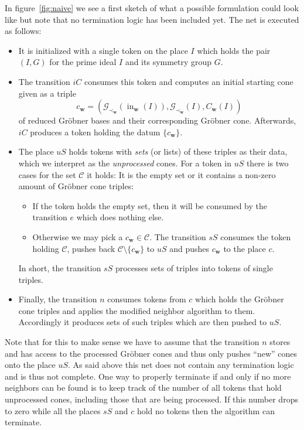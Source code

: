 \documentclass[
  paper=a4,
  titlepage,
  bibliography=totoc,
  listof=totoc,
  pagesize=pdftex
]{scrartcl}
\numberwithin{figure}{section}
\numberwithin{equation}{section}
\numberwithin{table}{section}
\let\vec\mathbf
\DeclareMathOperator{\initial}{in}
\theoremstyle{definition}
\numberwithin{definition}{section}
\begin{document}
In figure~\ref{fig:naive} we see a first sketch of what a possible formulation could look
like but note that no termination logic has been included yet. The net is executed as
follows:
\begin{itemize}
  \item It is initialized with a single token on the place $I$ which holds the pair $(I,
    G)$ for the prime ideal $I$ and its symmetry group $G$.
  \item The transition $iC$ consumes this token and computes an initial starting cone
    given as a triple
    \[
      c_{\vec w} = (
        \mathcal G_{\prec_{\vec w}}(\initial_{\vec w}(I)),
        \mathcal G_{\prec_{\vec w}}(I),
        C_{\vec w}(I)
      )
    \]
    of reduced Gröbner bases and their corresponding Gröbner cone. Afterwards, $iC$
    produces a token holding the datum $\{c_{\vec w}\}$.
  \item The place $uS$ holds tokens with \emph{sets} (or lists) of these triples as their
    data, which we interpret as the \emph{unprocessed} cones. For a token in $uS$ there is
    two cases for the set $\mathcal C$ it holds: It is the empty set or it contains a
    non-zero amount of Gröbner cone triples:
    \begin{itemize}
      \item If the token holds the empty set, then it will be consumed by the transition
        $e$ which does nothing else.
      \item Otherwise we may pick a $c_{\vec w} \in \mathcal C$. The transition $sS$
        consumes the token holding $\mathcal C$, pushes back $\mathcal C\setminus \{
        c_{\vec w}\}$ to $uS$ and pushes $c_{\vec w}$ to the place $c$.
    \end{itemize}
    In short, the transition $sS$ processes sets of triples into tokens of single triples.
  \item Finally, the transition $n$ consumes tokens from $c$ which holds the Gröbner cone
    triples and applies the modified neighbor algorithm to them. Accordingly it produces
    sets of such triples which are then pushed to $uS$.
\end{itemize}
Note that for this to make sense we have to assume that the transition $n$ stores and has
access to the processed Gröbner cones and thus only pushes \enquote{new} cones onto the
place $uS$. As said above this net does not contain any termination logic and is thus not
complete. One way to properly terminate if and only if no more neighbors can be found is
to keep track of the number of all tokens that hold unprocessed cones, including those
that are being processed. If this number drops to zero while all the places $sS$ and $c$
hold no tokens then the algorithm can terminate.
\end{document}
